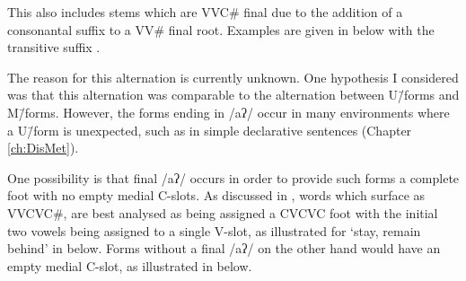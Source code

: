 This also includes stems which are VVC{\#} final due
to the addition of a consonantal suffix to a VV{\#} final root.
Examples are given in  below with the transitive suffix .

\begin{exe}
	\label{ex:VV-C/VV-CaqAlt}
\end{exe}

The reason for this alternation is currently unknown.
One hypothesis I considered was that
this alternation was comparable to the alternation between U\=/forms and M\=/forms.
However, the forms ending in /aʔ/ occur in many environments where
a U\=/form is unexpected, such as in simple declarative sentences (Chapter \ref{ch:DisMet}).

One possibility is that final /aʔ/ occurs in order
to provide such forms a complete foot with no empty medial C-slots.
As discussed in , words which surface as VVCVC{\#},
are best analysed as being assigned a CVCVC foot with the initial
two vowels being assigned to a single V-slot, as illustrated for 
`stay, remain behind' in  below.
Forms without a final /aʔ/ on the other hand would have an empty medial C-slot,
as illustrated in  below.

